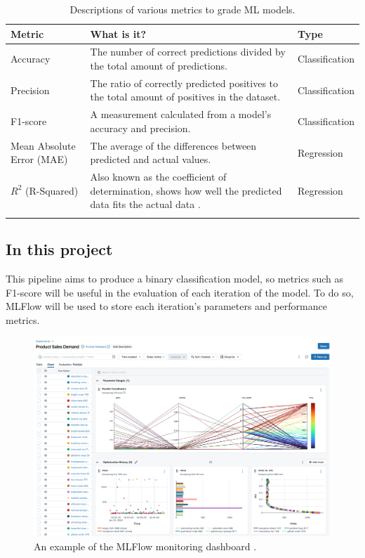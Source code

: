 \documentclass[12pt]{report}
\begin{document}
\begin{longtable}{ |p{}| p{}| p{}|}
    \hline
    \cellcolor{blue!25}Metric & \cellcolor{blue!25}What is it? & \cellcolor{blue!25}Type\\
    \hline
    Accuracy & The number of correct predictions divided by the total amount of predictions. & Classification\\
    \hline
    Precision & The ratio of correctly predicted positives to the total amount of positives in the dataset. 
    & Classification \\
    \hline
    F1-score & A measurement calculated from a model's accuracy and precision.\autocite{kundu_f1_nodate} & Classification\\
    \hline
    Mean Absolute Error (MAE) & The average of the differences between predicted and actual values. & Regression\\
    \hline
    $R^2$ (R-Squared) & Also known as the coefficient of determination, shows how well the predicted data fits the 
    actual data \autocite{cfi_r-squared_nodate}. & Regression \\
    \hline
\caption{Descriptions of various metrics to grade ML models.}\label{tab:metrics}
\end{longtable}


\subsection{In this project}
This pipeline aims to produce a binary classification model, so metrics such as F1-score will be useful in the evaluation
of each iteration of the model. To do so, MLFlow will be used to store each iteration's parameters and performance
metrics. 

\begin{figure}[H]
    \centering
    \includegraphics[width=.75\linewidth]{MLFlowSample.png}
    \caption{An example of the MLFlow monitoring dashboard \autocite{mlflow_mlflow_nodate}.}
    \label{fig:MLFlowSample}
\end{figure}
\end{document}
